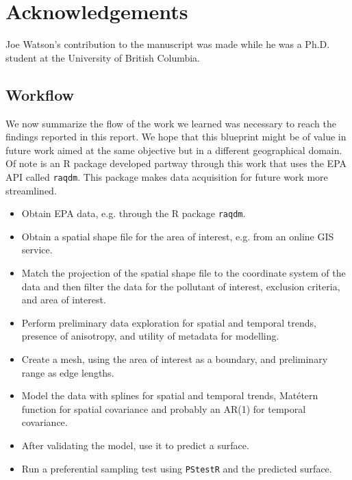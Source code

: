 \section{Acknowledgements}\label{sec:acknowledgements}
Joe Watson's contribution to 
the manuscript was made while he was a 
Ph.D. student at the University of 
British Columbia. 


\subsection{Workflow}
\label{subsec:workflow}
We now summarize the flow of the work we learned was necessary to reach the findings reported in this report. We hope that this blueprint might be of value in future work aimed at the same objective but in a different geographical domain.  Of note is an R package developed partway through this work that uses the EPA API called \texttt{raqdm}.  This package makes data acquisition for future work more streamlined.

\begin{itemize}
	\item Obtain \ac{EPA} data, e.g. through the R package \texttt{raqdm}.
	\item Obtain a spatial shape file for the area of interest, e.g. from an online GIS service.
	\item Match the projection of the spatial shape file to the coordinate system of the data and then filter the data for the pollutant of interest, exclusion criteria, and area of interest.
	\item Perform preliminary data exploration for spatial and temporal trends, presence of anisotropy, and utility of metadata for modelling. 
	\item Create a mesh, using the area of interest as a boundary, and preliminary range as edge lengths.
	\item Model the data with splines for spatial and temporal trends, Mat\'{e}tern function for spatial covariance and probably an AR(1) for temporal covariance.  
	\item After validating the model, use it to predict a surface.
	\item Run a preferential sampling test using \texttt{PStestR} and the predicted surface.
\end{itemize}